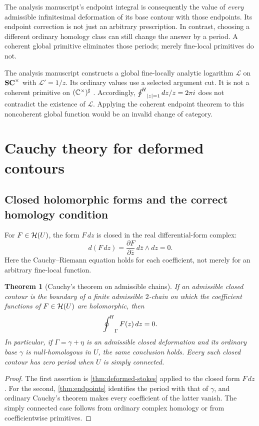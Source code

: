 \documentclass[11pt,letterpaper]{article}
\newtheorem{theorem}{Theorem}[section]
\theoremstyle{definition}
\theoremstyle{remark}
\newcommand{\C}{\mathbb C}\newcommand{\R}{\mathbb R}\newcommand{\Q}{\mathbb Q}\newcommand{\Z}{\mathbb Z}\newcommand{\N}{\mathbb N}
\numberwithin{equation}{section}
\begin{document}
The analysis manuscript's endpoint integral is consequently the value of \emph{every} admissible infinitesimal deformation of its base contour with those endpoints. Its endpoint correction is not just an arbitrary prescription. In contrast, choosing a different ordinary homology class can still change the answer by a period. A coherent global primitive eliminates those periods; merely fine-local primitives do not.

\begin{example}
The analysis manuscript constructs a global fine-locally analytic logarithm $\mathcal L$ on $\mathbf{SC}^\times$ with $\mathcal L'=1/z$. Its ordinary values use a selected argument cut. It is not a coherent primitive on $(\C^\times)\sh$ \cite[section on global logarithms]{Analysis}. Accordingly, $\mathop{\oint^{\!H}}\nolimits_{|z|=1}dz/z=2\pi i$ does not contradict the existence of $\mathcal L$. Applying the coherent endpoint theorem to this noncoherent global function would be an invalid change of category.
\end{example}

\section{Cauchy theory for deformed contours}\label{sec:cauchy}
\subsection{Closed holomorphic forms and the correct homology condition}
For $F\in\mathcal H(U)$, the form $F\,dz$ is closed in the real differential-form complex:
\[
 d(F\,dz)=\frac{\partial F}{\partial\bar z}\,d\bar z\wedge dz=0.
\]
Here the Cauchy--Riemann equation holds for each coefficient, not merely for an arbitrary fine-local function.

\begin{theorem}[Cauchy's theorem on admissible chains]\label{thm:cauchy}
If an admissible closed contour is the boundary of a finite admissible $2$-chain on which the coefficient functions of $F\in\mathcal H(U)$ are holomorphic, then
\[
 \mathop{\oint^{\!H}}\nolimits_\Gamma F(z)\,dz=0.
\]
In particular, if $\Gamma=\gamma+\eta$ is an admissible closed deformation and its ordinary base $\gamma$ is null-homologous in $U$, the same conclusion holds. Every such closed contour has zero period when $U$ is simply connected.
\end{theorem}
\begin{proof}
The first assertion is \cref{thm:deformed-stokes} applied to the closed form $F\,dz$. For the second, \cref{thm:endpoints} identifies the period with that of $\gamma$, and ordinary Cauchy's theorem makes every coefficient of the latter vanish. The simply connected case follows from ordinary complex homology or from coefficientwise primitives.
\end{proof}
\end{document}
